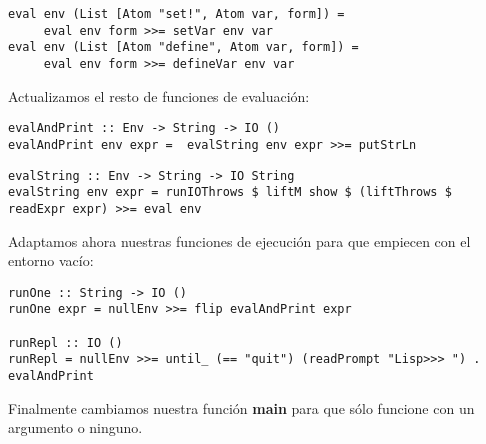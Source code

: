 \begin{minipage}{\linewidth}
\begin{footnotesize}
\begin{lstlisting}[frame=single]
eval env (List [Atom "set!", Atom var, form]) =
     eval env form >>= setVar env var
eval env (List [Atom "define", Atom var, form]) =
     eval env form >>= defineVar env var
\end{lstlisting}
\end{footnotesize}
\end{minipage}

Actualizamos el resto de funciones de evaluaci\'on:\\

\begin{minipage}{\linewidth}
\begin{footnotesize}
\begin{lstlisting}[frame=single]
evalAndPrint :: Env -> String -> IO ()
evalAndPrint env expr =  evalString env expr >>= putStrLn
\end{lstlisting}
\end{footnotesize}
\end{minipage}

\begin{minipage}{\linewidth}
\begin{tiny}
\begin{lstlisting}[frame=single]
evalString :: Env -> String -> IO String
evalString env expr = runIOThrows $ liftM show $ (liftThrows $ readExpr expr) >>= eval env
\end{lstlisting}
\end{tiny}
\end{minipage}

Adaptamos ahora nuestras funciones de ejecuci\'on para que empiecen con el entorno vac\'io:\\

\begin{minipage}{\linewidth}
\begin{scriptsize}
\begin{lstlisting}[frame=single]
runOne :: String -> IO ()
runOne expr = nullEnv >>= flip evalAndPrint expr

runRepl :: IO ()
runRepl = nullEnv >>= until_ (== "quit") (readPrompt "Lisp>>> ") . evalAndPrint
\end{lstlisting}
\end{scriptsize}
\end{minipage}

Finalmente cambiamos nuestra funci\'on \textbf{main} para que s\'olo funcione con un argumento o ninguno.\\

